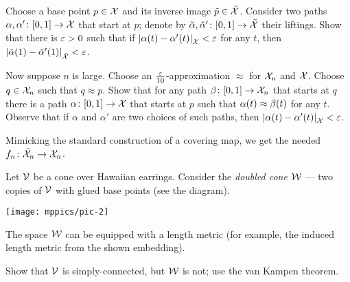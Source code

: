 Choose a base point $p\in \mathcal{X}$ and its inverse image $\tilde p\in \tilde{\mathcal{X}}$.
Consider two paths $\alpha,\alpha'\:[0,1]\z\to \spc{X}$ that start at $p$;
denote by $\tilde \alpha,\tilde \alpha'\:[0,1]\z\to \tilde{\spc{X}}$ their liftings.
Show that there is $\varepsilon>0$ such that if $\dist{\alpha(t)}{\alpha'(t)}{\spc{X}}<\eps$ for any $t$, then $\dist{\tilde \alpha(1)}{\tilde \alpha'(1)}{\tilde{\spc{X}}}<\eps$.

Now suppose $n$ is large.
Choose an $\tfrac{\varepsilon}{10}$-approximation $\approx$ for $\mathcal{X}_n$ and $\mathcal{X}$.
Choose $q\in\mathcal{X}_n$ such that $q\approx p$.
Show that for any path $\beta\colon[0,1]\to \mathcal{X}_n$ that starts at $q$ there is a path $\alpha\colon[0,1]\to \mathcal{X}$ that starts at $p$ such that $\alpha(t)\z\approx\beta(t)$ for any $t$.
Observe that if $\alpha$ and $\alpha'$ are two choices of such paths, then $\dist{\alpha(t)}{\alpha'(t)}{\spc{X}}<\eps$.

Mimicking the standard construction of a covering map, we get the needed $f_n\colon\tilde{\mathcal{X}}_n\to \mathcal{X}_n$.



Let $\mathcal{V}$ be a cone over Hawaiian earrings.
Consider the \textit{doubled cone} $\mathcal{W}$ --- two copies of $\mathcal{V}$ with glued base points (see the diagram).

\begin{Figure}
\vskip-0mm
\centering
\texttt{[image: mppics/pic-2]}
\end{Figure}

The space $\mathcal{W}$ can be equipped with a length metric
(for example, the induced length metric from the shown embedding).

Show that $\mathcal{V}$ is simply-connected, but $\mathcal{W}$ is not; use the van Kampen theorem.

